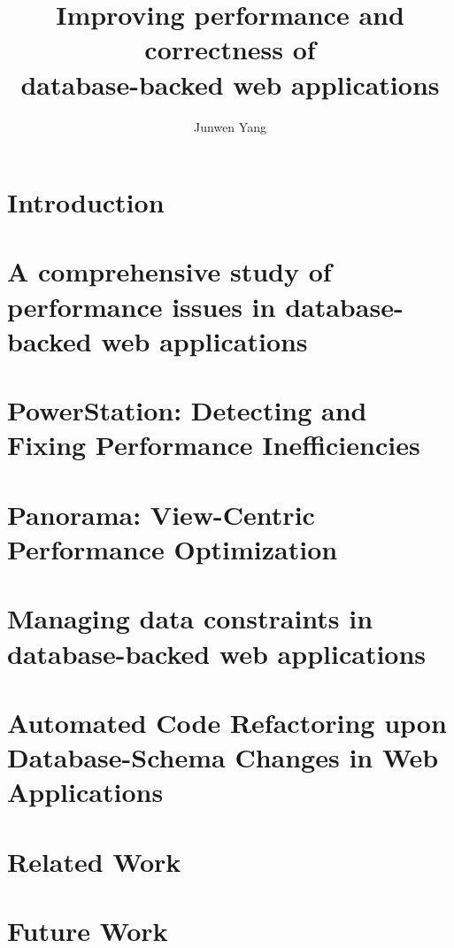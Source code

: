 \documentclass{ucetd}
\title{Improving performance and correctness of \\ database-backed web applications}
\author{Junwen Yang}
\date{}
\begin{document}
\maketitle

\makecopyright
\makededication
\makeepigraph


\tableofcontents
\listoffigures
\listoftables

\acknowledgments


\abstract

\mainmatter

\chapter{Introduction}




\chapter{A comprehensive study of performance issues in database-backed web applications}



\chapter{PowerStation: Detecting and Fixing Performance Inefficiencies}


\chapter{Panorama: View-Centric Performance Optimization}

\chapter{Managing data constraints in database-backed web applications}


\chapter{Automated Code Refactoring upon Database-Schema Changes in Web Applications}



\chapter{Related Work}



\chapter{Future Work}


%
%


\end{document}
